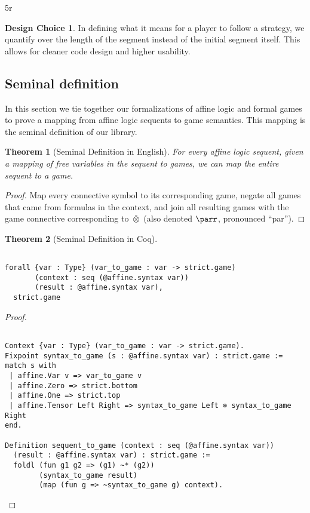 5r\documentclass{article}
\newtheorem{thm}{Theorem}
\theoremstyle{definition}
\newtheorem*{designchoice}{Design Choice}
\begin{document}
\begin{designchoice}
In defining what it means for a player to follow a strategy, we quantify over the length of the segment instead of the initial segment itself. This allows for cleaner code design and higher usability. 
\end{designchoice}

\subsection{Seminal definition}

In this section we tie together our formalizations of affine logic and formal games to prove a mapping from affine logic sequents to game semantics. This mapping is the seminal definition of our library.

\setcounter{thmseminal}{\value{thm}}
\begin{thm}[Seminal Definition in English] For every affine logic sequent, given a mapping of free variables in the sequent to games, we can map the entire sequent to a game. 
\end{thm}
\begin{proof} Map every connective symbol to its corresponding game, negate all games that came from formulas in the context, and join all resulting games with the game connective corresponding to $\bar\otimes$ (also denoted $\parr$, pronounced ``par'').
\end{proof}

\setcounter{savethm}{\value{thm}}
\setcounter{thm}{\value{thmseminal}}
\begin{thm}[Seminal Definition in Coq]
\begin{verbatim}

forall {var : Type} (var_to_game : var -> strict.game)
       (context : seq (@affine.syntax var)) 
       (result : @affine.syntax var),
  strict.game
\end{verbatim}
\end{thm}
\begin{proof}
\begin{verbatim}

Context {var : Type} (var_to_game : var -> strict.game).
Fixpoint syntax_to_game (s : @affine.syntax var) : strict.game :=
match s with
 | affine.Var v => var_to_game v
 | affine.Zero => strict.bottom
 | affine.One => strict.top
 | affine.Tensor Left Right => syntax_to_game Left ⊗ syntax_to_game Right
end.

Definition sequent_to_game (context : seq (@affine.syntax var)) 
  (result : @affine.syntax var) : strict.game :=
  foldl (fun g1 g2 => (g1) ~* (g2))
        (syntax_to_game result)
        (map (fun g => ~syntax_to_game g) context).
\end{verbatim}
\end{proof}
\end{document}
